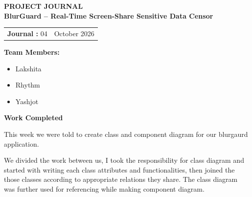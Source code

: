 \documentclass[12pt,a4paper]{article}
\begin{document}

\begin{center}
    {\Large \textbf{PROJECT JOURNAL }}\\[10pt]

    {\large \textbf{BlurGuard -- Real-Time Screen-Share Sensitive Data Censor}}
\end{center}

\vspace{10pt}


\begin{tabular}{@{}p{}p{}@{}}
\textbf{Journal :} 04 &
\raggedleft \textbf{} October 2026
\end{tabular}

\vspace{12pt}


\textbf{Team Members:}

\begin{itemize}[leftmargin=1.5cm]
    \item Lakshita
    \item Rhythm
    \item Yashjot
\end{itemize}

\vspace{5pt}


\textbf{\large Work Completed}

\vspace{4pt}
This week we were told to create class and component diagram for our blurgaurd application.

We divided the work between us, I took the responsibility for class diagram and started with writing each class attributes and functionalities, then joined the those classes  according to appropriate relations they share. 
The class diagram was further used for referencing while making component diagram.

\vspace{8pt}
\end{document}
